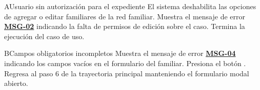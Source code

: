 \begin{UCtrayectoriaA}{A}{Usuario sin autorización para el expediente}
	\UCpaso El sistema deshabilita las opciones de agregar o editar familiares de la red familiar.
	\UCpaso Muestra el mensaje de error \hyperlink{mMSG02}{\bf MSG-02} indicando la falta de permisos de edición sobre el caso.
	\UCpaso Termina la ejecución del caso de uso.
\end{UCtrayectoriaA}

\begin{UCtrayectoriaA}{B}{Campos obligatorios incompletos}
	\UCpaso Muestra el mensaje de error \hyperlink{mMSG04}{\bf MSG-04} indicando los campos vacíos en el formulario del familiar.
	\UCpaso[\UCactor] Presiona el botón .
	\UCpaso Regresa al paso 6 de la trayectoria principal manteniendo el formulario modal abierto.
\end{UCtrayectoriaA}

